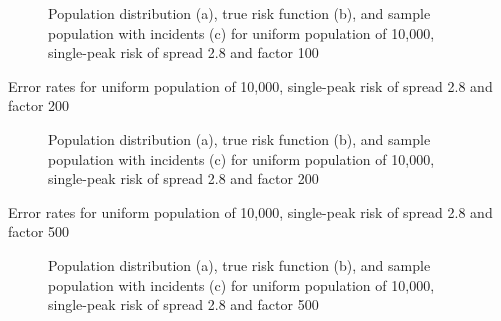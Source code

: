 {\begin{figure}[H]
    
    \caption[]{Population distribution (a), true risk function (b), and sample population with incidents (c) for uniform population of 10,000, single-peak risk of \gls{spread} 2.8 and \gls{factor} 100}
    \label{fig:distributions:unif_100_2.8_1h}    
\end{figure} \newpage



\begin{table}[H]

\caption[]{Error rates for uniform population of 10,000, single-peak risk of \gls{spread} 2.8 and \gls{factor} 200}
\label{tab:mean_error_rates:unif_200_2.8_1h}
\end{table}

\begin{figure}[H]
    
    \caption[]{Population distribution (a), true risk function (b), and sample population with incidents (c) for uniform population of 10,000, single-peak risk of \gls{spread} 2.8 and \gls{factor} 200}
    \label{fig:distributions:unif_200_2.8_1h}    
\end{figure} \newpage



\begin{table}[H]

\caption[]{Error rates for uniform population of 10,000, single-peak risk of \gls{spread} 2.8 and \gls{factor} 500}
\label{tab:mean_error_rates:unif_500_2.8_1h}
\end{table}

\begin{figure}[H]
    
    \caption[]{Population distribution (a), true risk function (b), and sample population with incidents (c) for uniform population of 10,000, single-peak risk of \gls{spread} 2.8 and \gls{factor} 500}
    \label{fig:distributions:unif_500_2.8_1h}    
\end{figure} \newpage



}
